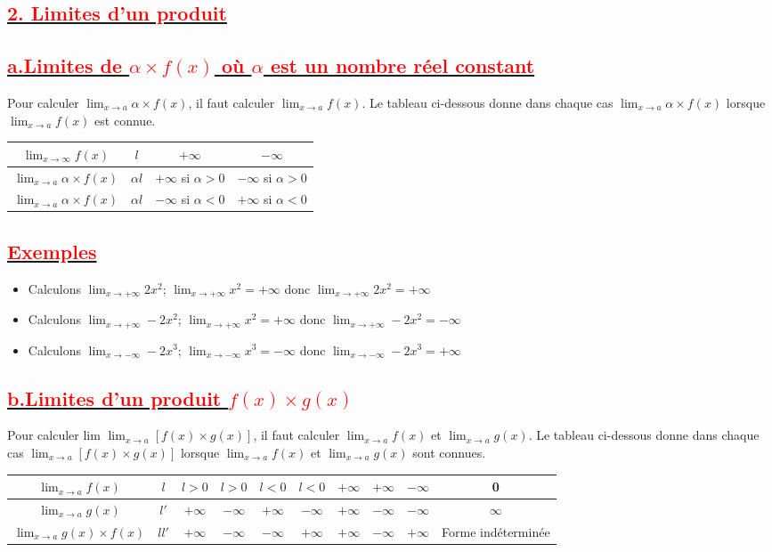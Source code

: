 \documentclass[12pt]{article}
\begin{document}
\subsection*{\underline{\textbf{\textcolor{red}{2. Limites d’un produit}}}}
\subsection*{\underline{\textbf{\textcolor{red}{a.Limites de $\alpha\times f(x)$ où $\alpha$ est un nombre réel constant}}}}
Pour calculer $\lim_{x \to a}\alpha\times f(x)$, il faut calculer 
$\lim_{x \to a}f(x)$. Le tableau ci-dessous donne dans chaque cas $\lim_{x \to a}\alpha\times f(x)$ lorsque $\lim_{x \to a}f(x)$ est connue.\\
\begin{tabular}{|c|c|c|c|}
\hline
$\lim_{x \to \infty}f(x)$ & $l$ & $+\infty$ & $-\infty$ \\
\hline
$\lim_{x \to a}\alpha \times f(x)$ & $\alpha l$ & $+\infty$ si $\alpha > 0$ & $-\infty$ si $\alpha > 0$ \\
\hline
$\lim_{x \to a}\alpha \times f(x)$ & $\alpha l$ & $-\infty$ si $\alpha < 0$ & $+\infty$ si $\alpha < 0$ \\
\hline
\end{tabular}
\subsection*{\underline{\textbf{\textcolor{red}{Exemples}}}}
\begin{itemize}
\item Calculons $\lim_{x \to +\infty}2x^{2}$; $\lim_{x \to +\infty}x^{2}=+\infty$ donc $\lim_{x \to +\infty}2x^{2}=+\infty$
\item Calculons $\lim_{x \to +\infty}-2x^{2}$; $\lim_{x \to +\infty}x^{2}=+\infty$ donc $\lim_{x \to +\infty}-2x^{2}=-\infty$
\item Calculons $\lim_{x \to -\infty}-2x^{3}$; $\lim_{x \to -\infty}x^{3}=-\infty$ donc $\lim_{x \to -\infty}-2x^{3}=+\infty$
\end{itemize}
\subsection*{\underline{\textbf{\textcolor{red}{b.Limites d’un produit $f(x)\times g(x)$}}}}
Pour calculer lim $\lim_{x \to a}[f(x)\times g(x)]$, il faut calculer $\lim_{x \to a}f(x)$ et $\lim_{x \to a}g(x)$. Le tableau ci-dessous donne dans chaque cas $\lim_{x \to a}[f(x)\times g(x)]$ lorsque $\lim_{x \to a}f(x)$ et $\lim_{x \to a}g(x)$ sont connues.\\
\begin{tabular}{|c|c|c|c|c|c|c|c|c|c|}
\hline
$\lim_{x \to a}f	(x)$ & $l$ & $l>0$ & $l>0$ & $l<0$ &$l<0$& $+\infty$&$+\infty$&$-\infty$& 0\\
\hline
$\lim_{x \to a}g(x)$ & $l'$ & $+\infty$ & $-\infty$ & $+\infty$ &$-\infty$ &$+\infty$&
$-\infty$&$-\infty$&$\infty$\\
\hline
$\lim_{x \to a}g(x)\times f(x)$ & $ll'$ & $+\infty$ & $-\infty$ & $-\infty$ &$+\infty$ &$+\infty$&$-\infty$&$+\infty$&Forme indéterminée\\
\hline
\end{tabular}
\end{document}
